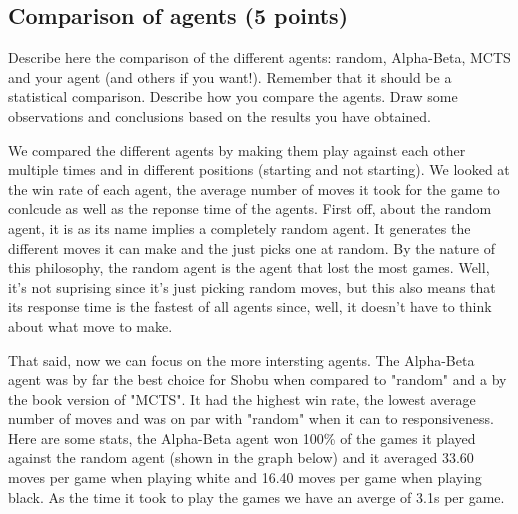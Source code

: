 \documentclass[11pt,a4paper]{report}
\begin{document}
\begin{answers}[23cm]
\end{answers}



\newpage
\subsection{Comparison of agents (5 points)}
Describe here the comparison of the different agents: random, Alpha-Beta, MCTS and your agent (and others if you want!). Remember that it should be a statistical comparison. Describe how you compare the agents. Draw some observations and conclusions based on the results you have obtained.

\begin{answers}[20cm]
    We compared the different agents by making them play against each other multiple times and in different positions (starting and not starting).
    We looked at the win rate of each agent, the average number of moves it took for the game to conlcude as well as the reponse time of the agents.
    First off, about the random agent, it is as its name implies a completely random agent. It generates the different moves it can make
    and the just picks one at random. By the nature of this philosophy, the random agent is the agent that lost the most games. Well, it's not 
    suprising since it's just picking random moves, but this also means that its response time is the fastest of all agents since, well, 
    it doesn't have to think about what move to make.

    That said, now we can focus on the more intersting agents. The Alpha-Beta agent was by far the best choice for Shobu when compared to 
    "random" and a by the book version of "MCTS". It had the highest win rate, the lowest average number of moves and was on par with 
    "random" when it can to responsiveness. 
    Here are some stats, the Alpha-Beta agent won 100\% of the games it played against the random agent (shown in the graph below) and it averaged 
    33.60 moves per game when playing white and 16.40 moves per game when playing black. As the time it took to play the games we have an averge of 3.1s per game.
    

\end{answers}
\end{document}
